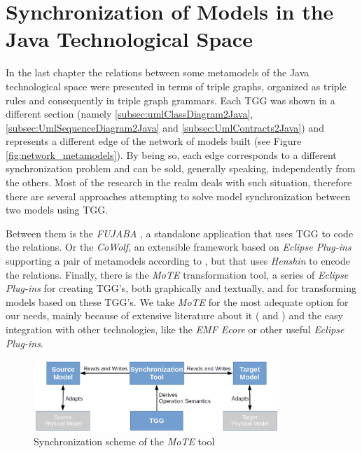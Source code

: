 \documentclass[tuberlin,cic,tc,english,noabntcite]{iiufrgs}
\begin{document}
\chapter{Synchronization of Models in the Java Technological Space}
\label{chapter:metamodel_synchronization}

In the last chapter the relations between some metamodels of the Java technological space were presented in terms of triple graphs, organized as triple rules and consequently in triple graph grammars. Each TGG was shown in a different section (namely \ref{subsec:umlClassDiagram2Java}, \ref{subsec:UmlSequenceDiagram2Java} and \ref{subsec:UmlContracts2Java}) and represents a different edge of the network of models built (see Figure \ref{fig:network_metamodels}). By being so, each edge corresponds to a different synchronization problem and can be sold, generally speaking, independently from the others. Most of the research in the realm deals with such situation, therefore there are several approaches attempting to solve model synchronization between two models using TGG.

Between them is the \emph{FUJABA} \citep{nickel2000fujaba}, a standalone application that uses TGG to code the relations. Or the \emph{CoWolf}, an extensible framework based on \emph{Eclipse Plug-ins} supporting a pair of metamodels according to \citet{getir2015cowolf}, but that uses \emph{Henshin} \citep{arendt2010henshin} to encode the relations. Finally, there is the \emph{MoTE} transformation tool, a series of \emph{Eclipse Plug-ins} for creating TGG's, both graphically and textually, and for transforming models based on these TGG's. We take \emph{MoTE} for the most adequate option for our needs, mainly because of extensive literature about it (\citep{giese2009efficient} and \citep{hildebrandt2012mdelab}) and the easy integration with other technologies, like the \emph{EMF Ecore} or other useful \emph{Eclipse Plug-ins}.

\begin{figure}[H]
    \caption{Synchronization scheme of the \emph{MoTE} tool}
    \begin{center}
        \includegraphics[width=25em]{MoTE_scheme}
    \end{center}
    \label{fig:MoTE_scheme}
\end{figure}
\end{document}
